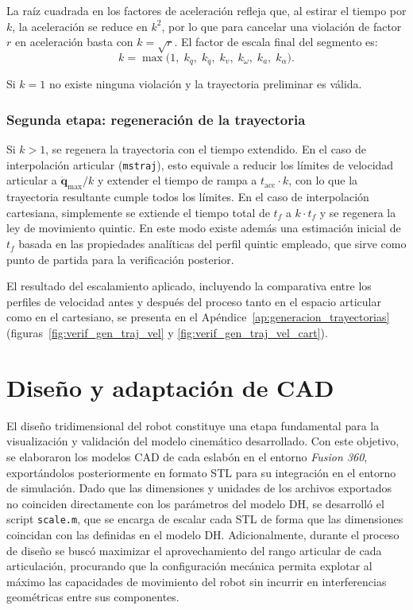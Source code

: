 \documentclass{article}
\begin{document}
La raíz cuadrada en los factores de aceleración refleja que, al estirar el tiempo por $k$, la aceleración se reduce en $k^2$, por lo que para cancelar una violación de factor $r$ en aceleración basta con $k = \sqrt{r}$. El factor de escala final del segmento es:
\begin{equation}
    k = \max\bigl(1,\; k_{\dot{q}},\; k_{\ddot{q}},\; k_v,\; k_\omega,\; k_a,\; k_\alpha\bigr).
\end{equation}

Si $k = 1$ no existe ninguna violación y la trayectoria preliminar es válida.

\subsubsection*{Segunda etapa: regeneración de la trayectoria}

Si $k > 1$, se regenera la trayectoria con el tiempo extendido. En el caso de interpolación articular (\texttt{mstraj}), esto equivale a reducir los límites de velocidad articular a $\dot{\mathbf{q}}_{\max}/k$ y extender el tiempo de rampa a $t_{\mathrm{acc}} \cdot k$, con lo que la trayectoria resultante cumple todos los límites. En el caso de interpolación cartesiana, simplemente se extiende el tiempo total de $t_f$ a $k \cdot t_f$ y se regenera la ley de movimiento quintic. En este modo existe además una estimación inicial de $t_f$ basada en las propiedades analíticas del perfil quintic empleado, que sirve como punto de partida para la verificación posterior.


El resultado del escalamiento aplicado, incluyendo la comparativa entre los perfiles de velocidad antes y después del proceso tanto en el espacio articular como en el cartesiano, se presenta en el Apéndice~\ref{ap:generacion_trayectorias} (figuras~\ref{fig:verif_gen_traj_vel} y \ref{fig:verif_gen_traj_vel_cart}).





\newpage
\section{Diseño y adaptación de CAD}
\label{sec:CAD}

El diseño tridimensional del robot constituye una etapa fundamental para la visualización y validación del modelo cinemático desarrollado. Con este objetivo, se elaboraron los modelos CAD de cada eslabón en el entorno \textit{Fusion 360}, exportándolos posteriormente en formato STL para su integración en el entorno de simulación. Dado que las dimensiones y unidades de los archivos exportados no coinciden directamente con los parámetros del modelo DH, se desarrolló el script \colorbox{gray!20}{\texttt{scale.m}}, que se encarga de escalar cada STL de forma que las dimensiones coincidan con las definidas en el modelo DH. Adicionalmente, durante el proceso de diseño se buscó maximizar el aprovechamiento del rango articular de cada articulación, procurando que la configuración mecánica permita explotar al máximo las capacidades de movimiento del robot sin incurrir en interferencias geométricas entre sus componentes.
\end{document}

